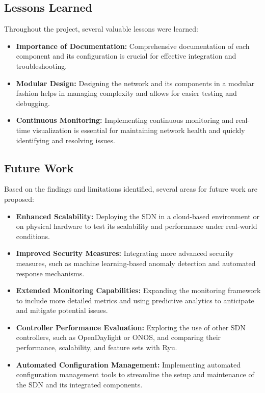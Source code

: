 \documentclass[a4paper,12pt]{article}
\begin{document}
\subsection{Lessons Learned}

Throughout the project, several valuable lessons were learned:
\begin{itemize}
    \item \textbf{Importance of Documentation:} Comprehensive documentation of each component and its configuration is crucial for effective integration and troubleshooting.
    \item \textbf{Modular Design:} Designing the network and its components in a modular fashion helps in managing complexity and allows for easier testing and debugging.
    \item \textbf{Continuous Monitoring:} Implementing continuous monitoring and real-time visualization is essential for maintaining network health and quickly identifying and resolving issues.
\end{itemize}

\subsection{Future Work}

Based on the findings and limitations identified, several areas for future work are proposed:
\begin{itemize}
    \item \textbf{Enhanced Scalability:} Deploying the SDN in a cloud-based environment or on physical hardware to test its scalability and performance under real-world conditions.
    \item \textbf{Improved Security Measures:} Integrating more advanced security measures, such as machine learning-based anomaly detection and automated response mechanisms.
    \item \textbf{Extended Monitoring Capabilities:} Expanding the monitoring framework to include more detailed metrics and using predictive analytics to anticipate and mitigate potential issues.
    \item \textbf{Controller Performance Evaluation:} Exploring the use of other SDN controllers, such as OpenDaylight or ONOS, and comparing their performance, scalability, and feature sets with Ryu.
    \item \textbf{Automated Configuration Management:} Implementing automated configuration management tools to streamline the setup and maintenance of the SDN and its integrated components.
\end{itemize}
\end{document}
